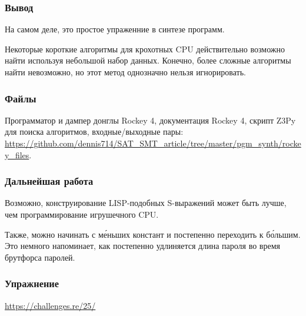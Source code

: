 \subsubsection{Вывод}

На самом деле, это простое упраженние в синтезе программ.

Некоторые короткие алгоритмы для крохотных \ac{CPU} действительно возможно найти используя небольшой набор данных.
Конечно, более сложные алгоритмы найти невозможно,
но этот метод однозначно нельзя игнорировать.

\subsubsection{Файлы}

Программатор и дампер донглы Rockey 4, документация Rockey 4, скрипт Z3Py для поиска алгоритмов, входные/выходные пары:
\url{https://github.com/dennis714/SAT_SMT_article/tree/master/pgm_synth/rockey_files}.

\subsubsection{Дальнейшая работа}

Возможно, конструирование LISP-подобных S-выражений может быть лучше, чем программирование игрушечного CPU.

Также, можно начинать с м\'{е}ньших констант и постепенно переходить к б\'{о}льшим.
Это немного напоминает, как постепенно удлиняется длина пароля во время брутфорса паролей.

\subsubsection{Упражнение}

\url{https://challenges.re/25/}


